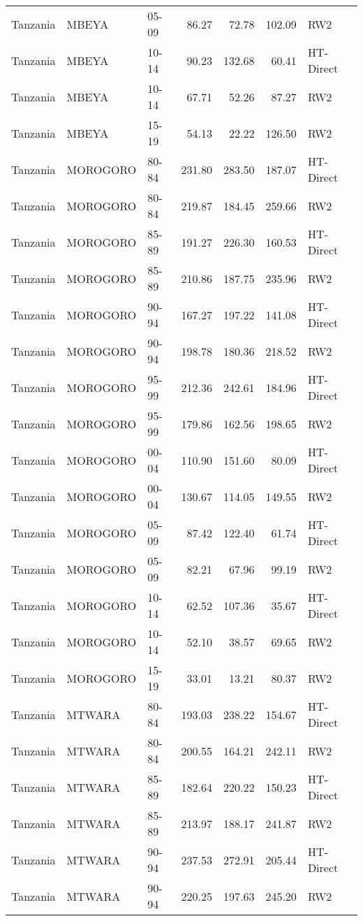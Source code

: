 \begin{longtable}{lllrrrl}
  Tanzania & MBEYA & 05-09 & 86.27 & 72.78 & 102.09 & RW2 \\ 
  Tanzania & MBEYA & 10-14 & 90.23 & 132.68 & 60.41 & HT-Direct \\ 
  Tanzania & MBEYA & 10-14 & 67.71 & 52.26 & 87.27 & RW2 \\ 
  Tanzania & MBEYA & 15-19 & 54.13 & 22.22 & 126.50 & RW2 \\ 
  Tanzania & MOROGORO & 80-84 & 231.80 & 283.50 & 187.07 & HT-Direct \\ 
  Tanzania & MOROGORO & 80-84 & 219.87 & 184.45 & 259.66 & RW2 \\ 
  Tanzania & MOROGORO & 85-89 & 191.27 & 226.30 & 160.53 & HT-Direct \\ 
  Tanzania & MOROGORO & 85-89 & 210.86 & 187.75 & 235.96 & RW2 \\ 
  Tanzania & MOROGORO & 90-94 & 167.27 & 197.22 & 141.08 & HT-Direct \\ 
  Tanzania & MOROGORO & 90-94 & 198.78 & 180.36 & 218.52 & RW2 \\ 
  Tanzania & MOROGORO & 95-99 & 212.36 & 242.61 & 184.96 & HT-Direct \\ 
  Tanzania & MOROGORO & 95-99 & 179.86 & 162.56 & 198.65 & RW2 \\ 
  Tanzania & MOROGORO & 00-04 & 110.90 & 151.60 & 80.09 & HT-Direct \\ 
  Tanzania & MOROGORO & 00-04 & 130.67 & 114.05 & 149.55 & RW2 \\ 
  Tanzania & MOROGORO & 05-09 & 87.42 & 122.40 & 61.74 & HT-Direct \\ 
  Tanzania & MOROGORO & 05-09 & 82.21 & 67.96 & 99.19 & RW2 \\ 
  Tanzania & MOROGORO & 10-14 & 62.52 & 107.36 & 35.67 & HT-Direct \\ 
  Tanzania & MOROGORO & 10-14 & 52.10 & 38.57 & 69.65 & RW2 \\ 
  Tanzania & MOROGORO & 15-19 & 33.01 & 13.21 & 80.37 & RW2 \\ 
  Tanzania & MTWARA & 80-84 & 193.03 & 238.22 & 154.67 & HT-Direct \\ 
  Tanzania & MTWARA & 80-84 & 200.55 & 164.21 & 242.11 & RW2 \\ 
  Tanzania & MTWARA & 85-89 & 182.64 & 220.22 & 150.23 & HT-Direct \\ 
  Tanzania & MTWARA & 85-89 & 213.97 & 188.17 & 241.87 & RW2 \\ 
  Tanzania & MTWARA & 90-94 & 237.53 & 272.91 & 205.44 & HT-Direct \\ 
  Tanzania & MTWARA & 90-94 & 220.25 & 197.63 & 245.20 & RW2 \\ 

\end{longtable}
